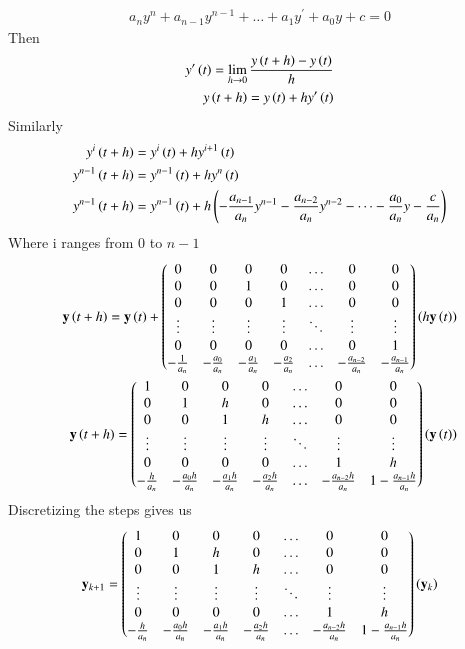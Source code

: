 \documentclass[journal]{IEEEtran}
\begin{document}
\begin{align}
	a_{n}y^n + a_{n-1}y^{n-1} + \dots + a_{1}y^\prime + a_{0}y + c = 0
\end{align}
Then
\begin{align}
	y^{\prime}\left(t\right) = \lim_{h\to 0}\frac{y\left(t+h\right) - y\left(t\right)}{h}\\
	y\left(t+h\right) = y\left(t\right) + hy^{\prime}\left(t\right)
\end{align}
Similarly
\begin{align}
	y^{i}\left(t+h\right) &= y^{i}\left(t\right) + hy^{i+1}\left(t\right)\\
	y^{n-1}\left(t+h\right) &= y^{n-1}\left(t\right) + hy^{n}\left(t\right)\\
	y^{n-1}\left(t+h\right) &= y^{n-1}\left(t\right) + h\left(-\frac{a_{n-1}}{a_n}y^{n-1}-\frac{a_{n-2}}{a_n}y^{n-2} - \dots -\frac{a_{0}}{a_n}y - \frac{c}{a_n}\right)
\end{align}
Where i ranges from 0 to $n-1$\\
\begin{align}
	\mathbf{y}\left(t+h\right) = \mathbf{y}\left(t\right) + \begin{pmatrix}0 & 0 & 0 & 0 & \dots & 0 & 0\\ 0 & 0 & 1 & 0 & \dots & 0 & 0\\0 & 0 & 0 & 1 & \dots & 0 & 0\\\vdots & \vdots & \vdots & \vdots& \ddots & \vdots & \vdots\\
	0 & 0 & 0 & 0 & \dots & 0 & 1\\-\frac{1}{a_n} & -\frac{a_0}{a_n} & -\frac{a_1}{a_n} & -\frac{a_2}{a_n} & \dots & -\frac{a_{n-2}}{a_n} & -\frac{a_{n-1}}{a_n}\end{pmatrix}\left(h\mathbf{y}\left(t\right)\right)\\
	\mathbf{y}\left(t+h\right) = \begin{pmatrix}1 & 0 & 0 & 0 & \dots & 0 & 0\\ 0 & 1 & h & 0 & \dots & 0 & 0\\0 & 0 & 1 & h & \dots & 0 & 0\\\vdots & \vdots & \vdots & \vdots& \ddots & \vdots & \vdots\\
	0 & 0 & 0 & 0 & \dots & 1 & h\\-\frac{h}{a_n} & -\frac{a_0h}{a_n} & -\frac{a_1h}{a_n} & -\frac{a_2h}{a_n} & \dots & -\frac{a_{n-2}h}{a_n} & 1-\frac{a_{n-1}h}{a_n}\end{pmatrix}\left(\mathbf{y}\left(t\right)\right)
\end{align}
Discretizing the steps gives us
\begin{align}
	\mathbf{y}_{k+1} = \begin{pmatrix}1 & 0 & 0 & 0 & \dots & 0 & 0\\ 0 & 1 & h & 0 & \dots & 0 & 0\\0 & 0 & 1 & h & \dots & 0 & 0\\\vdots & \vdots & \vdots & \vdots& \ddots & \vdots & \vdots\\
	0 & 0 & 0 & 0 & \dots & 1 & h\\-\frac{h}{a_n} & -\frac{a_0h}{a_n} & -\frac{a_1h}{a_n} & -\frac{a_2h}{a_n} & \dots & -\frac{a_{n-2}h}{a_n} & 1-\frac{a_{n-1}h}{a_n}\end{pmatrix}\left(\mathbf{y}_{k}\right)
\end{align}
\end{document}
